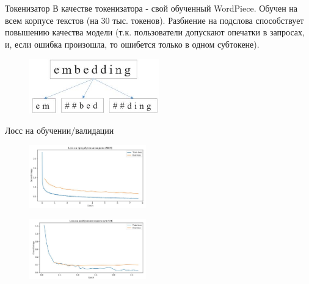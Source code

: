 \begin{frame}{Токенизатор}
    В качестве токенизатора - свой обученный WordPiece. Обучен на всем корпусе текстов (на 30 тыс. токенов). Разбиение на подслова способствует повышению качества модели (т.к. пользователи допускают опечатки в запросах, и, если ошибка произошла, то ошибется только в одном субтокене).
    
	\begin{figure}[H]
		\includegraphics[width=0.5\textwidth]{tok.jpg}
		\label{fig:sample}
	\end{figure}
\end{frame}

\begin{frame}{Лосс на обучении/валидации}
	\begin{figure}[H]
		\includegraphics[width=0.45\textwidth]{loss_pretrain.jpg}
		\label{fig:sample}
	\end{figure}

	\begin{figure}[H]
		\includegraphics[width=0.45\textwidth]{loss_ner.jpg}
		\label{fig:sample}
	\end{figure}
\end{frame}

